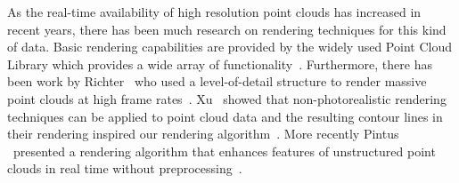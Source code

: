  As the real-time availability of high resolution point clouds has increased in recent years, there has been much research on rendering techniques for this kind of data. Basic rendering capabilities are provided by the widely used Point Cloud Library which provides a wide array of functionality~\cite{Rusu11ICRA}. Furthermore, there has been work by Richter \etal\ who used a level-of-detail structure to render massive point clouds at high frame rates~\cite{Richter:2010:ORV:1811158.1811178}. Xu \etal\ showed that non-photorealistic rendering techniques can be applied to point cloud data and the resulting contour lines in their rendering inspired our rendering algorithm~\cite{conf/npar/XuC04}. More recently Pintus \etal\ presented a rendering algorithm that enhances features of unstructured point clouds in real time without preprocessing~\cite{Pintus:2011:RRM:2384495.2384513}.
